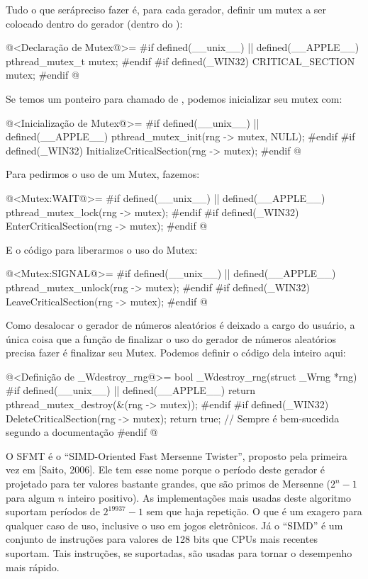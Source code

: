 Tudo o que serápreciso fazer é, para cada gerador, definir um mutex a
ser colocado dentro do gerador (dentro do ):

\iniciocodigo
@<Declaração de Mutex@>=
#if defined(__unix__) || defined(__APPLE__)
pthread_mutex_t mutex;
#endif
#if defined(_WIN32)
CRITICAL_SECTION mutex;
#endif
@
\fimcodigo

Se temos um ponteiro para  chamado
de , podemos inicializar seu mutex com:

\iniciocodigo
@<Inicialização de Mutex@>=
#if defined(__unix__) || defined(__APPLE__)
pthread_mutex_init(rng -> mutex, NULL);
#endif
#if defined(_WIN32)
InitializeCriticalSection(rng -> mutex);
#endif
@
\fimcodigo

Para pedirmos o uso de um Mutex, fazemos:

\iniciocodigo
@<Mutex:WAIT@>=
#if defined(__unix__) || defined(__APPLE__)
pthread_mutex_lock(rng -> mutex);
#endif
#if defined(_WIN32)
EnterCriticalSection(rng -> mutex);
#endif
@
\fimcodigo

E o código para liberarmos o uso do Mutex:

\iniciocodigo
@<Mutex:SIGNAL@>=
#if defined(__unix__) || defined(__APPLE__)
pthread_mutex_unlock(rng -> mutex);
#endif
#if defined(_WIN32)
LeaveCriticalSection(rng -> mutex);
#endif
@
\fimcodigo

Como desalocar o gerador de números aleatórios é deixado a cargo do
usuário, a única coisa que a função de finalizar o uso do gerador de
números aleatórios precisa fazer é finalizar seu Mutex. Podemos
definir o código dela inteiro aqui:

\iniciocodigo
@<Definição de \_Wdestroy\_rng@>=
bool _Wdestroy_rng(struct _Wrng *rng){
#if defined(__unix__) || defined(__APPLE__)
  return pthread_mutex_destroy(&(rng -> mutex));
#endif
#if defined(_WIN32)
  DeleteCriticalSection(rng -> mutex);
  return true; // Sempre é bem-sucedida segundo a documentação
#endif
}
@
\fimcodigo



O SFMT é o ``SIMD-Oriented Fast Mersenne Twister'', proposto pela
primeira vez em [Saito, 2006]. Ele tem esse nome porque o período
deste gerador é projetado para ter valores bastante grandes, que são
primos de Mersenne ($2^n-1$ para algum $n$ inteiro positivo). As
implementações mais usadas deste algoritmo suportam períodos de
$2^{19937}-1$ sem que haja repetição. O que é um exagero para qualquer
caso de uso, inclusive o uso em jogos eletrônicos. Já o ``SIMD'' é um
conjunto de instruções para valores de 128 bits que CPUs mais recentes
suportam. Tais instruções, se suportadas, são usadas para tornar o
desempenho mais rápido.

